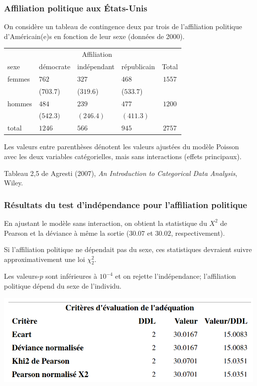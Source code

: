\documentclass{beamer}
\begin{document}
\begin{frame}[fragile]
 \frametitle{Affiliation politique aux États-Unis}
 On considère un tableau de contingence deux par trois de l'affiliation politique d'Américain(e)s en fonction de leur sexe (données de 2000).
 \begin{center}
 \begin{tabular}{llllc}
 \toprule 
  & \multicolumn{3}{c}{Affiliation} & \\
  \cmidrule(r){2-4}
  sexe & démocrate & indépendant & républicain & Total\\
  femmes & $762$ & $327$ & $468$ & $1557$ \\
   & ($703.7$) & ($319.6$) & ($533.7$) & \\
   hommes & $484$ & $239$ & $477$ & $1200$ \\
    & ($542.3)$ & $(246.4)$ & $(411.3)$ & \\
    total & $1246$ & $566$ & $945$ &$2757$\\
    \bottomrule 
    \end{tabular}
    \end{center}
    Les valeurs entre parenthèses dénotent les valeurs ajustées du modèle Poisson avec les deux variables catégorielles, mais sans interactions (effets principaux).

     
     \vp
  {   \footnotesize
 Tableau 2,5 de  Agresti (2007), \textsl{An Introduction to
Categorical Data Analysis}, Wiley.


}
\end{frame}
\begin{frame}
 \frametitle{Résultats du test d'indépendance  pour l'affiliation politique}
   \bi \item     
En ajustant le modèle sans interaction, on obtient la statistique du $X^2$ de Pearson et la déviance à même la sortie ($30.07$ et $30.02$, respectivement).
\item Si l'affiliation politique ne dépendait pas du sexe, ces statistiques devraient suivre approximativement une loi $\chi^2_2$.
\item Les valeurs-$p$ sont inférieures à $10^{-4}$ et on rejette l'indépendance; l'affiliation politique dépend du sexe de l'individu.
\ei
\begin{center}
 \includegraphics[width = 0.8\linewidth]{img/c4/diapos8-e1}
\end{center}
\end{frame}
\end{document}
